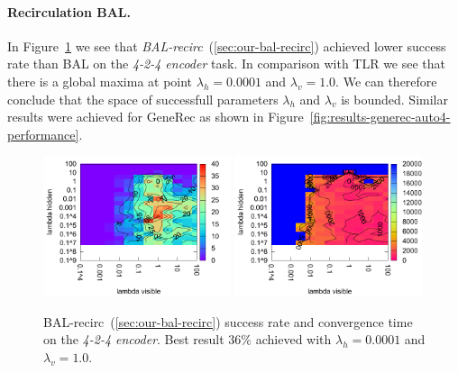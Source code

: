 \paragraph{Recirculation BAL.} 
In Figure~\ref{fig:results-bal-recirc-auto4-performance} we see that \emph{BAL-recirc}~(\ref{sec:our-bal-recirc}) achieved lower success rate than BAL on the \emph{4-2-4 encoder} task. In comparison with TLR we see that there is a global maxima at point $\lambda_h = 0.0001$ and $\lambda_v=1.0$. We can therefore conclude that the space of successfull parameters $\lambda_h$ and $\lambda_v$ is bounded. Similar results were achieved for GeneRec as shown in Figure~\ref{fig:results-generec-auto4-performance}.
\begin{figure}[H]
  \centering
  \includegraphics[width=0.49\textwidth]{img/bal-recirc-auto4-success.pdf}   
  \includegraphics[width=0.49\textwidth]{img/bal-recirc-auto4-epoch.pdf}     
  \caption{BAL-recirc~(\ref{sec:our-bal-recirc}) success rate and convergence time on the \emph{4-2-4 encoder}. Best result $36\%$ achieved with $\lambda_h = 0.0001$ and $\lambda_v=1.0$.}
  \label{fig:results-bal-recirc-auto4-performance}
\end{figure}


